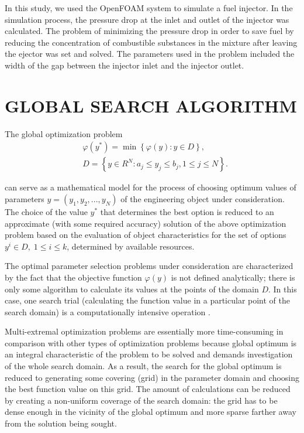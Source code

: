 \documentclass{aip-cp}
\begin{document}
In this study, we used the OpenFOAM system to simulate a fuel injector. In the simulation process, the pressure drop at the inlet and outlet of the injector was calculated. The problem of minimizing the pressure drop in order to save fuel by reducing the concentration of combustible substances in the mixture after leaving the ejector was set and solved. The parameters used in the problem included the width of the gap between the injector inlet and the injector outlet.

\section{GLOBAL SEARCH ALGORITHM}


The global optimization problem
\begin{eqnarray}\label{problem}
&\varphi(y^\ast)=\min{\left\{\varphi(y):y\in D\right\}},\\
&D=\left\{y\in R^N: a_j\leq y_j \leq b_j, 1\leq j \leq N \right\}.\label{D}
\end{eqnarray}

can serve as a mathematical model for the process of choosing optimum values of parameters $y=(y_1,y_2,...,y_N)$ of the engineering object under consideration.
The choice of the value  $y^*$ that determines the best option  is reduced to an approximate (with some required accuracy) solution of the above optimization problem based on the evaluation of object characteristics for the set of options $y^i\in D, \; 1 \leq i \leq k$, determined by available resources.

The optimal parameter selection problems under consideration are characterized by the fact that the objective function $\varphi(y)$ is not defined analytically; there is only some algorithm to calculate its values at the points of the domain $D$.  In this case, one search trial (calculating the function value in a particular point of the search domain) is a computationally intensive operation \cite{Kalyulin2017}.

Multi-extremal optimization problems are essentially more time-consuming in comparison with other types of optimization problems because global optimum is an integral characteristic of the problem to be solved and demands investigation of the whole search domain. As a result, the search for the global optimum is reduced to generating  some covering (grid) in the parameter domain and choosing the best function value on this grid. The amount of calculations can be reduced by creating a non-uniform coverage of the search domain: the grid has to be dense enough in the vicinity of the global optimum and more sparse farther away from the solution being sought.
\end{document}
